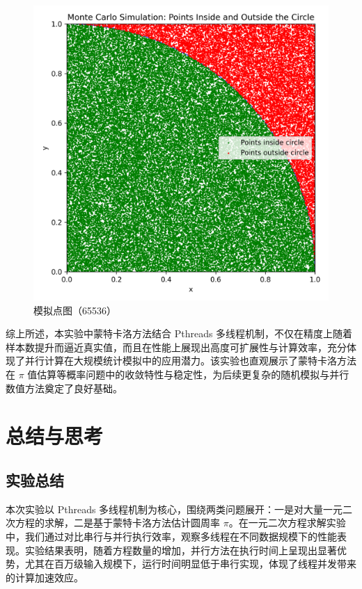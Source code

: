 \documentclass[a4paper, utf8]{ctexart}
\begin{document}
\begin{figure}
\begin{minipage}{.26\textwidth}
			\centering
			\includegraphics[height=.13\textheight]{./figure/points_plot_65536.png}
			\caption{模拟点图（65536）}
		\end{minipage}
	\end{figure}
	
	综上所述，本实验中蒙特卡洛方法结合 Pthreads 多线程机制，不仅在精度上随着样本数提升而逼近真实值，而且在性能上展现出高度可扩展性与计算效率，充分体现了并行计算在大规模统计模拟中的应用潜力。该实验也直观展示了蒙特卡洛方法在 $\pi$ 值估算等概率问题中的收敛特性与稳定性，为后续更复杂的随机模拟与并行数值方法奠定了良好基础。
	
	\section{总结与思考}
	
	\subsection{实验总结}
	
	本次实验以 Pthreads 多线程机制为核心，围绕两类问题展开：一是对大量一元二次方程的求解，二是基于蒙特卡洛方法估计圆周率 $\pi$。在一元二次方程求解实验中，我们通过对比串行与并行执行效率，观察多线程在不同数据规模下的性能表现。实验结果表明，随着方程数量的增加，并行方法在执行时间上呈现出显著优势，尤其在百万级输入规模下，运行时间明显低于串行实现，体现了线程并发带来的计算加速效应。
	
\end{document}

